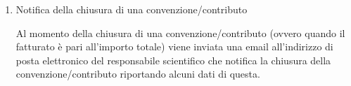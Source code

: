 \begin{enumerate}
\begin{enumerate}
  
 \item Notifica della chiusura di una convenzione/contributo\\ \label{UC_notify_closed_contract}
 
    Al momento della chiusura di una convenzione/contributo (ovvero quando il fatturato è pari all'importo totale) viene inviata una email all'indirizzo di posta elettronico del responsabile scientifico che notifica la chiusura della
    convenzione/contributo riportando alcuni dati di questa.
\end{enumerate}


\end{enumerate}

